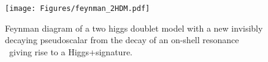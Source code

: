 %
%
%




\begin{figure}[htbp]
   \centering
   \texttt{[image: Figures/feynman\_2HDM.pdf]}
   \caption{Feynman diagram of a two higgs doublet model with a new
     invisibly decaying pseudoscalar \Az from the decay of an on-shell
     resonance \cPZpr\  giving rise to a Higgs+\MET signature. }
   \label{fig:feynman}
\end{figure}


